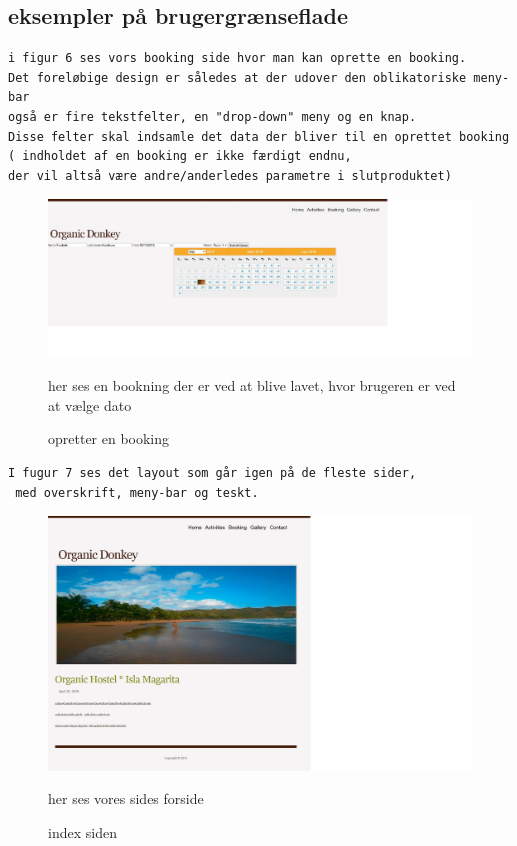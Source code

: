 \documentclass[12pt,a4paper]{article}
\begin{document}
\subsection{eksempler på brugergrænseflade}
\begin{verbatim}
i figur 6 ses vors booking side hvor man kan oprette en booking. 
Det foreløbige design er således at der udover den oblikatoriske meny-bar 
også er fire tekstfelter, en "drop-down" meny og en knap.
Disse felter skal indsamle det data der bliver til en oprettet booking 
( indholdet af en booking er ikke færdigt endnu, 
der vil altså være andre/anderledes parametre i slutproduktet)  
\end{verbatim}
\begin{figure}[H]
\centering
\includegraphics[scale=0.5] {brugergransefladebilled1.jpg}
\caption{opretter en booking}
her ses en bookning der er ved at blive lavet, hvor brugeren er ved at vælge dato
\end{figure}
\begin{verbatim}
I fugur 7 ses det layout som går igen på de fleste sider,
 med overskrift, meny-bar og teskt.
\end{verbatim}
\begin{figure}[H]
\centering
\includegraphics[scale=0.6] {brugergransefladebilled2.jpg}
\caption{index siden}
her ses vores sides forside 
\end{figure}
\end{document}

